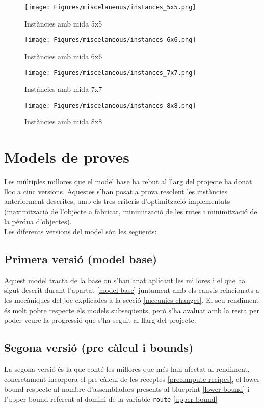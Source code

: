 \begin{figure}[H]
    \centering
    \texttt{[image: Figures/miscelaneous/instances\_5x5.png]}
    \caption{Instàncies amb mida 5x5}
\end{figure}
\begin{figure}[H]
    \centering
    \texttt{[image: Figures/miscelaneous/instances\_6x6.png]}
    \caption{Instàncies amb mida 6x6}
\end{figure}
\begin{figure}[H]
    \centering
    \texttt{[image: Figures/miscelaneous/instances\_7x7.png]}
    \caption{Instàncies amb mida 7x7}
\end{figure}
\begin{figure}[H]
    \centering
    \texttt{[image: Figures/miscelaneous/instances\_8x8.png]}
    \caption{Instàncies amb mida 8x8}
\end{figure}

\section{Models de proves}
Les múltiples millores que el model base ha rebut al llarg del projecte ha donat lloc a cinc versions. Aquestes s'han posat a prova resolent les instàncies anteriorment descrites, amb els tres criteris d'optimització implementats (maximització de l'objecte a fabricar, minimització de les rutes i minimització de la pèrdua d'objectes).\\
Les diferents versions del model són les següents:

\subsection{Primera versió (model base)}
Aquest model tracta de la base on s'han anat aplicant les millores i el que ha sigut descrit durant l'apartat \ref{model-base} juntament amb els canvis relacionats a les mecàniques del joc explicades a la secció \ref{mecanics-changes}. El seu rendiment és molt pobre respecte els models subseqüents, però s'ha avaluat amb la resta per poder veure la progressió que s'ha seguit al llarg del projecte.

\subsection{Segona versió (pre càlcul i bounds)}
La segona versió és la que conté les millores que més han afectat al rendiment, concretament incorpora el pre càlcul de les receptes \ref{precompute-recipes}, el lower bound respecte al nombre d'assembladors presents al blueprint \ref{lower-bound} i l'upper bound referent al domini de la variable \texttt{route} \ref{upper-bound}

